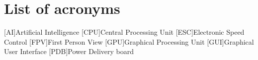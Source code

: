 \chapter*{List of acronyms}
\begin{acronym} 
    [AI]{Artificial Intelligence}
    [CPU]{Central Processing Unit}
    [ESC]{Electronic Speed Control}
    [FPV]{First Person View}
    [GPU]{Graphical Processing Unit}
    [GUI]{Graphical User Interface}
    [PDB]{Power Delivery board}
\end{acronym}